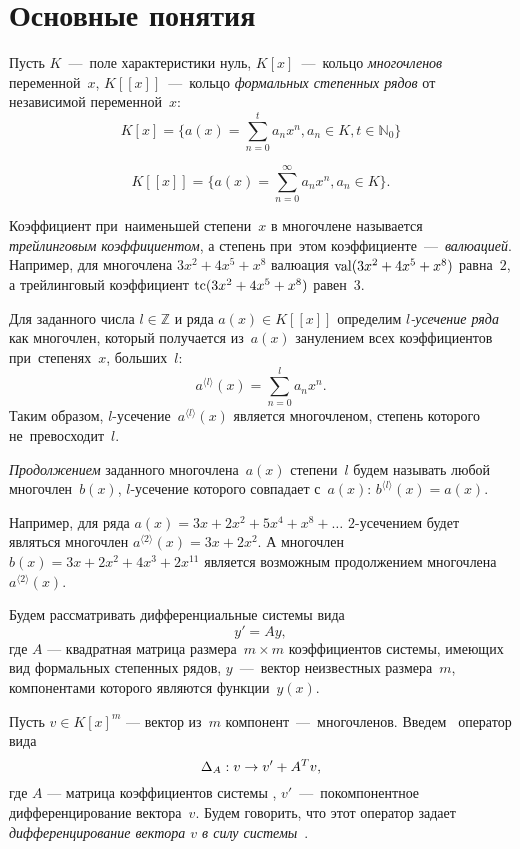 \section{Основные понятия}

Пусть $K$~---~поле характеристики нуль,  $K[x]$~---~кольцо \emph{многочленов} переменной~$x$,  $K[[x]]$~---~кольцо \emph{формальных степенных рядов} от независимой переменной~$x$:
\[
	K[x] = \{a(x) = \sum\limits_{n = 0}^t a_n x^n, a_n \in K, t \in \mathbb{N}_0\}
\]

\[
	K[[x]] = \{a(x) = \sum\limits_{n = 0}^\infty a_n x^n, a_n \in K\}.
\]

Коэффициент при~наименьшей степени~$x$ в многочлене называется \emph{трейлинговым коэффициентом}, а степень при~этом коэффициенте~---~\emph{валюацией}.
Например, для многочлена $3x^2 + 4x^5 +x^8$ валюация $\mathop{\rm val}(3x^2 + 4x^5 +x^8)$ равна~$2$, а трейлинговый коэффициент $\mathop{\rm tc}(3x^2 + 4x^5 +x^8)$ равен~$3$.

Для заданного числа
$l \in \mathbb{Z}$
и ряда
$a(x) \in K[[x]]$
определим \emph{$l$-усечение ряда} как многочлен, который получается из~$a(x)$ занулением всех коэффициентов при~степенях~$x$, больших~$l$:
\[
	a^{\langle l \rangle}(x) = \sum\limits_{n = 0}^l a_nx^n .
\]
Таким образом, $l$-усечение~$a^{\langle l \rangle}(x)$ является многочленом, степень которого не~превосходит~$l$.


\emph{Продолжением} заданного многочлена~$a(x)$ степени~$l$ будем называть любой многочлен~$b(x)$,
$l$-усечение которого совпадает с~$a(x)$: $b^{\langle l \rangle}(x) = a(x)$.

Например, для ряда $ a(x) = 3x + 2x^2 + 5x^4 + x^8 + \dots $ $2$-усечением будет являться многочлен $ a^{\langle 2 \rangle}(x) = 3x + 2x^2 $.
А многочлен $ b(x) = 3x + 2x^2 + 4x^3 + 2x^{11} $ является возможным продолжением многочлена $a^{\langle 2 \rangle}(x)$.

\bigskip
Будем рассматривать дифференциальные системы вида
\begin{equation}
	y' = Ay,
	\label{system}
\end{equation}
где $A$ --- квадратная матрица размера~$m \times m$ коэффициентов системы, имеющих вид формальных степенных рядов,
$y$~---~вектор неизвестных размера~$m$, компонентами которого являются функции~$y(x)$.

Пусть $v \in K[x]^m$ --- вектор из~$m$ компонент~---~многочленов. Введем~\cite{litVanDerPut} оператор вида
\begin{equation}
\text{$ \Delta_A $}: v\rightarrow v' + A^T v,
\label{differention}
\end{equation}
где $A$ --- матрица коэффициентов системы , $v'$~---~покомпонентное дифференцирование вектора~$v$.
Будем говорить, что этот оператор задает \emph{дифференцирование вектора $v$ в силу системы}~.

